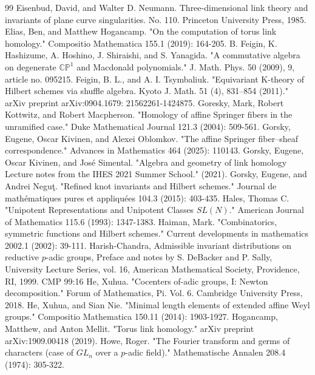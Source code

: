 \documentclass{amsart}
\numberwithin{equation}{section}
\theoremstyle{definition}
\newcommand{\fl}{\mathfrak{l}}
\newcommand{\fg}{\mathfrak{g}}
\begin{document}
\begin{thebibliography}{99}
 Eisenbud, David, and Walter D. Neumann. Three-dimensional link theory and invariants of plane curve singularities. No. 110. Princeton University Press, 1985.
 Elias, Ben, and Matthew Hogancamp. "On the computation of torus link homology." Compositio Mathematica 155.1 (2019): 164-205.
 B. Feigin, K. Hashizume, A. Hoshino, J. Shiraishi, and S. Yanagida. "A commutative
algebra on degenerate $\mathbb{CP}^1$ and Macdonald polynomials." J. Math. Phys. 50 (2009), 9,
article no. 095215.
 Feigin, B. L., and A. I. Tsymbaliuk. "Equivariant K-theory of Hilbert schemes via shuffle algebra. Kyoto J. Math. 51 (4), 831–854 (2011)." arXiv preprint arXiv:0904.1679: 21562261-1424875.
 Goresky, Mark, Robert Kottwitz, and Robert Macpherson. "Homology of affine Springer fibers in the unramified case." Duke Mathematical Journal 121.3 (2004): 509-561.
 Gorsky, Eugene, Oscar Kivinen, and Alexei Oblomkov. "The affine Springer fiber–sheaf correspondence." Advances in Mathematics 464 (2025): 110143.
 Gorsky, Eugene, Oscar Kivinen, and José Simental. "Algebra and geometry of link homology Lecture notes from the IHES 2021 Summer School." (2021).
 Gorsky, Eugene, and Andrei Neguţ. "Refined knot invariants and Hilbert schemes." Journal de mathématiques pures et appliquées 104.3 (2015): 403-435.
 Hales, Thomas C. "Unipotent Representations and Unipotent Classes $SL(N)$." American Journal of Mathematics 115.6 (1993): 1347-1383.
 Haiman, Mark. "Combinatorics, symmetric functions and Hilbert schemes." Current developments in mathematics 2002.1 (2002): 39-111.
 Harish-Chandra, Admissible invariant distributions on reductive $p$-adic groups, Preface and
notes by S. DeBacker and P. Sally, University Lecture Series, vol. 16, American Mathematical Society, Providence, RI, 1999. CMP 99:16
 He, Xuhua. "Cocenters of-adic groups, I: Newton decomposition." Forum of Mathematics, Pi. Vol. 6. Cambridge University Press, 2018.
 He, Xuhua, and Sian Nie. "Minimal length elements of extended affine Weyl groups." Compositio Mathematica 150.11 (2014): 1903-1927.
 Hogancamp, Matthew, and Anton Mellit. "Torus link homology." arXiv preprint arXiv:1909.00418 (2019).
 Howe, Roger. "The Fourier transform and germs of characters (case of $GL_n$ over a $p$-adic field)." Mathematische Annalen 208.4 (1974): 305-322.

\end{thebibliography}
\end{document}
